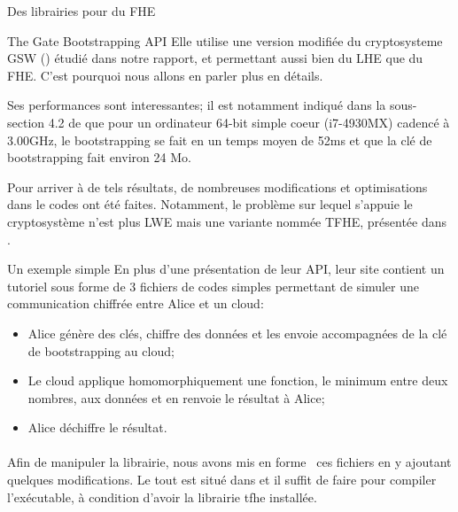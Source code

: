 \begin{section}{Des librairies pour du FHE}
\begin{subsection}{The Gate Bootstrapping API}
Elle utilise une version modifiée du cryptosysteme GSW (\cite{C:GenSahWat13})
étudié dans notre rapport, et permettant aussi bien du LHE que du FHE. C'est
pourquoi nous allons en parler plus en détails.

Ses performances sont interessantes; il est notamment indiqué dans la sous-section
4.2 de \cite{cryptoeprint:2016:870} que pour un ordinateur 64-bit simple coeur 
(i7-4930MX) cadencé à 3.00GHz, le bootstrapping se fait en un temps moyen de 52ms et 
que la clé de bootstrapping fait environ 24 Mo.

Pour arriver à de tels résultats, de nombreuses modifications et optimisations dans le codes ont été faites. Notamment,
le problème sur lequel s'appuie le cryptosystème n'est plus LWE mais une variante nommée TFHE, présentée dans
\cite{cryptoeprint:2016:870}. 

\begin{subsubsection}{Un exemple simple}
En plus d'une présentation de leur API, leur site contient un tutoriel sous forme de 3 fichiers de codes simples
permettant de simuler une communication chiffrée entre Alice et un cloud:
\begin{itemize}
\item Alice génère des clés, chiffre des données et les envoie accompagnées de la clé de bootstrapping au cloud;
\item Le cloud applique homomorphiquement une fonction, le minimum entre deux nombres, aux données et en renvoie le résultat à Alice;
\item Alice déchiffre le résultat.
\end{itemize}

\paragraph{}
Afin de manipuler la librairie, nous avons \og mis en forme \fg \ ces fichiers
en y ajoutant quelques modifications. Le tout est situé dans 
 et il suffit de faire  
pour compiler l'exécutable, à condition d'avoir la librairie tfhe installée.
	

\end{subsubsection}
\end{subsection}
\end{section}
